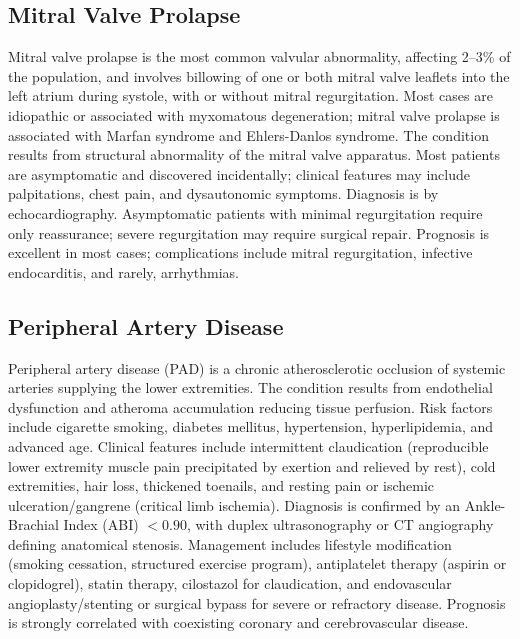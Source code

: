 \subsection{Mitral Valve Prolapse}
\label{sec:Mitral Valve Prolapse}
Mitral valve prolapse is the most common valvular abnormality, affecting 2--3\% of the population, and involves billowing of one or both mitral valve leaflets into the left atrium during systole, with or without mitral regurgitation. Most cases are idiopathic or associated with myxomatous degeneration; mitral valve prolapse is associated with Marfan syndrome and Ehlers-Danlos syndrome. The condition results from structural abnormality of the mitral valve apparatus. Most patients are asymptomatic and discovered incidentally; clinical features may include palpitations, chest pain, and dysautonomic symptoms. Diagnosis is by echocardiography. Asymptomatic patients with minimal regurgitation require only reassurance; severe regurgitation may require surgical repair. Prognosis is excellent in most cases; complications include mitral regurgitation, infective endocarditis, and rarely, arrhythmias.

\subsection{Peripheral Artery Disease}
\label{sec:Peripheral Artery Disease}
Peripheral artery disease (PAD) is a chronic atherosclerotic occlusion of systemic arteries supplying the lower extremities. The condition results from endothelial dysfunction and atheroma accumulation reducing tissue perfusion. Risk factors include cigarette smoking, diabetes mellitus, hypertension, hyperlipidemia, and advanced age. Clinical features include intermittent claudication (reproducible lower extremity muscle pain precipitated by exertion and relieved by rest), cold extremities, hair loss, thickened toenails, and resting pain or ischemic ulceration/gangrene (critical limb ischemia). Diagnosis is confirmed by an Ankle-Brachial Index (ABI) $<0.90$, with duplex ultrasonography or CT angiography defining anatomical stenosis. Management includes lifestyle modification (smoking cessation, structured exercise program), antiplatelet therapy (aspirin or clopidogrel), statin therapy, cilostazol for claudication, and endovascular angioplasty/stenting or surgical bypass for severe or refractory disease. Prognosis is strongly correlated with coexisting coronary and cerebrovascular disease.

